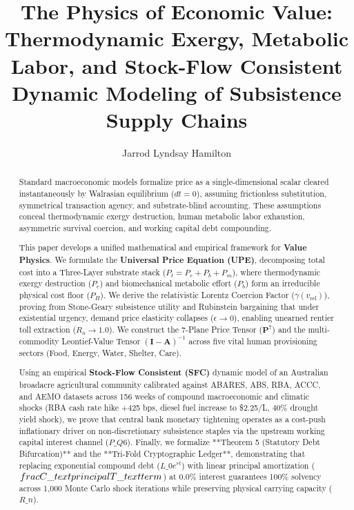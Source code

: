 \documentclass[preprint,12pt,authoryear]{elsarticle}
\theoremstyle{definition}
\begin{document}
\begin{frontmatter}

\title{The Physics of Economic Value: Thermodynamic Exergy, Metabolic Labor, and Stock-Flow Consistent Dynamic Modeling of Subsistence Supply Chains}

\author{Jarrod Lyndsay Hamilton}
\address{Alethekanon Research Institute, Coonabarabran, NSW 2357, Australia}

\begin{abstract}
Standard macroeconomic models formalize price as a single-dimensional scalar cleared instantaneously by Walrasian equilibrium ($dt = 0$), assuming frictionless substitution, symmetrical transaction agency, and substrate-blind accounting. These assumptions conceal thermodynamic exergy destruction, human metabolic labor exhaustion, asymmetric survival coercion, and working capital debt compounding.

  

This paper develops a unified mathematical and empirical framework for \textbf{Value Physics}. We formulate the \textbf{Universal Price Equation (UPE)}, decomposing total cost into a Three-Layer substrate stack ($P_t = P_e + P_b + P_m$), where thermodynamic exergy destruction ($P_e$) and biomechanical metabolic effort ($P_b$) form an irreducible physical cost floor ($P_H$). We derive the relativistic Lorentz Coercion Factor ($\gamma(v_{\text{rel}})$), proving from Stone-Geary subsistence utility and Rubinstein bargaining that under existential urgency, demand price elasticity collapses ($\epsilon \to 0$), enabling unearned rentier toll extraction ($R_a \to 1.0$). We construct the 7-Plane Price Tensor ($\mathbf{P}^7$) and the multi-commodity Leontief-Value Tensor $(\mathbf{I} - \mathbf{A})^{-1}$ across five vital human provisioning sectors (Food, Energy, Water, Shelter, Care).

  

Using an empirical \textbf{Stock-Flow Consistent (SFC)} dynamic model of an Australian broadacre agricultural community calibrated against ABARES, ABS, RBA, ACCC, and AEMO datasets across 156 weeks of compound macroeconomic and climatic shocks (RBA cash rate hike +425 bps, diesel fuel increase to \$2.25/L, 40\% drought yield shock), we prove that central bank monetary tightening operates as a cost-push inflationary driver on non-discretionary subsistence staples via the upstream working capital interest channel ($P\_{Q6}$). Finally, we formalize **Theorem 5 (Statutory Debt Bifurcation)** and the **Tri-Fold Cryptographic Ledger**, demonstrating that replacing exponential compound debt ($L\_0 e^{rt}$) with linear principal amortization ($\\frac{C\_{\\text{principal}}}{T\_{\\text{term}}}$) at 0.0\% interest guarantees 100\% solvency across 1,000 Monte Carlo shock iterations while preserving physical carrying capacity ($R\_n$).
\end{abstract}


\end{frontmatter}
\end{document}
